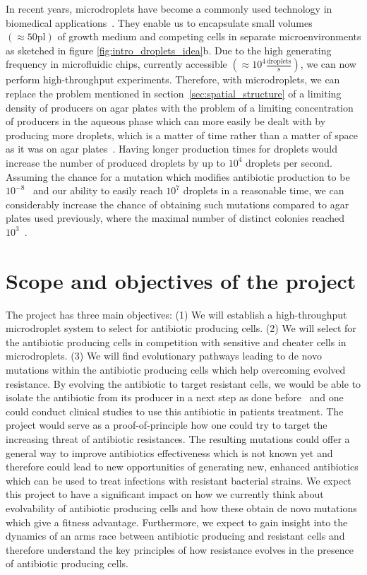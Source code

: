 In recent years, microdroplets have become a commonly used technology in biomedical applications~\cite{Zagnoni2011-ko}. They enable us to encapsulate small volumes $ \left( \approx 50 \mathrm{pl} \right)$ of growth medium and competing cells in separate microenvironments as sketched in figure \ref{fig:intro_droplets_idea}b. Due to the high generating frequency in microfluidic chips, currently accessible $\left( \approx 10^4 \frac{\mathrm{droplets}}{\mathrm{s}} \right) $, we can now perform high-throughput experiments.
Therefore, with microdroplets, we can replace the problem mentioned in section~\ref{sec:spatial_structure} of a limiting density of producers on agar plates with the problem of a limiting concentration of producers in the aqueous phase which can more easily be dealt with by producing more droplets, which is a matter of time rather than a matter of space as it was on agar plates~\cite{Gerardin2016-ac}. Having longer production times for droplets would increase the number of produced droplets by up to $10^4$ droplets per second.
Assuming the chance for a mutation which modifies antibiotic production to be $10^{-8}$~\cite{Drake1998-es, Kunkel2004-br, Wielgoss2011-jd} and our ability to easily reach $10^7$ droplets in a reasonable time, we can considerably increase the chance of obtaining such mutations compared to agar plates used previously, where the maximal number of distinct colonies reached $10^3$~\cite{Gerardin2016-ac}.

\section{Scope and objectives of the project}

The project has three main objectives:
(1) We will establish a high-throughput microdroplet system to select for antibiotic producing cells.
(2) We will select for the antibiotic producing cells in competition with sensitive and cheater cells in microdroplets.
(3) We will find evolutionary pathways leading to de novo mutations within the antibiotic producing cells which help overcoming evolved resistance.
By evolving the antibiotic to target resistant cells, we would be able to isolate the antibiotic from its producer in a next step as done before~\cite{Singh2018-qp} and one could conduct clinical studies to use this antibiotic in patients treatment. The project would serve as a proof-of-principle how one could try to target the increasing threat of antibiotic resistances.
The resulting mutations could offer a general way to improve antibiotics effectiveness which is not known yet and therefore could lead to new opportunities of generating new, enhanced antibiotics which can be used to treat infections with resistant bacterial strains.
We expect this project to have a significant impact on how we currently think about evolvability of antibiotic producing cells and how these obtain de novo mutations which give a fitness advantage. Furthermore, we expect to gain insight into the dynamics of an arms race between antibiotic producing and resistant cells and therefore understand the key principles of how resistance evolves in the presence of antibiotic producing cells.


